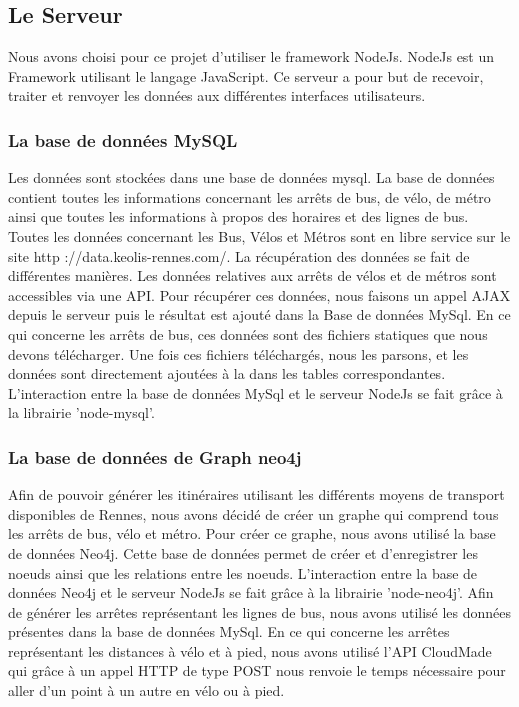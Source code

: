 \documentclass[twocolumn]{article}   		%
\begin{document}
	\subsection{Le Serveur}
	
	Nous avons choisi pour ce projet d'utiliser le framework NodeJs. NodeJs est un Framework utilisant le langage JavaScript. Ce serveur a pour but de recevoir, traiter et renvoyer les donn\'ees aux diff\'erentes interfaces utilisateurs.
	
	
	\subsubsection{La base de donn\'ees MySQL}
	
	Les donn\'ees sont stock\'ees dans une base de donn\'ees mysql. La base de donn\'ees contient toutes les informations concernant les arr\^ets de bus, de v\'elo, de m\'etro ainsi que toutes les informations \`a propos des horaires et des lignes de bus. Toutes les donn\'ees concernant les Bus, V\'elos et M\'etros sont en libre service sur le site http ://data.keolis-rennes.com/.
La r\'ecup\'eration des donn\'ees se fait de diff\'erentes mani\`eres. Les donn\'ees relatives aux arr\^ets de v\'elos et de m\'etros sont accessibles via une API. Pour r\'ecup\'erer ces donn\'ees, nous faisons un appel AJAX depuis le serveur puis le r\'esultat est ajout\'e dans la Base de donn\'ees MySql. En ce qui concerne les arr\^ets de bus, ces donn\'ees sont des fichiers statiques que nous devons t\'el\'echarger. Une fois ces fichiers t\'el\'echarg\'es, nous les parsons, et les donn\'ees sont directement ajout\'ees \`a la dans les tables correspondantes. L'interaction entre la base de donn\'ees MySql et le serveur NodeJs se fait gr\^ace \`a la librairie 'node-mysql'.
	
	\subsubsection{La base de donn\'ees de Graph neo4j }
	
	Afin de pouvoir g\'en\'erer les itin\'eraires utilisant les diff\'erents moyens de transport disponibles de Rennes, nous avons d\'ecid\'e de cr\'eer un graphe qui comprend tous les arr\^ets de bus, v\'elo et m\'etro. Pour cr\'eer ce graphe, nous avons utilis\'e la base de donn\'ees Neo4j. Cette base de donn\'ees permet de cr\'eer et d'enregistrer les noeuds ainsi que les relations entre les noeuds.
L'interaction entre la base de donn\'ees Neo4j et le serveur NodeJs se fait gr\^ace \`a la librairie 'node-neo4j'. Afin de g\'en\'erer les arr\^etes repr\'esentant les lignes de bus, nous avons utilis\'e les donn\'ees pr\'esentes dans la base de donn\'ees MySql. En ce qui concerne les arr\^etes repr\'esentant les distances \`a v\'elo et \`a pied, nous avons utilis\'e l'API CloudMade qui gr\^ace \`a un appel HTTP de type POST nous renvoie le temps n\'ecessaire pour aller d'un point \`a un autre en v\'elo ou \`a pied.
\end{document}
